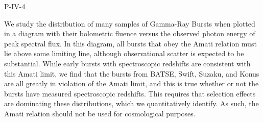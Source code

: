 P-IV-4


\bigskip



\bigskip

\noindent We study the distribution of many samples of Gamma-Ray Bursts when plotted in a diagram with their bolometric fluence versus the observed photon energy of peak spectral flux.  In this diagram, all bursts that obey the Amati relation must lie above some limiting line, although observational scatter is expected to be substantial.  While early bursts with spectroscopic redshifts are consistent with this Amati limit, we find that the bursts from BATSE, Swift, Suzaku, and Konus are all greatly in violation of the Amati limit, and this is true whether or not the bursts have measured spectroscopic redshifts.  This requires that selection effects are dominating these distributions, which we quantitatively identify.  As such, the Amati relation should not be used for cosmological purposes.
